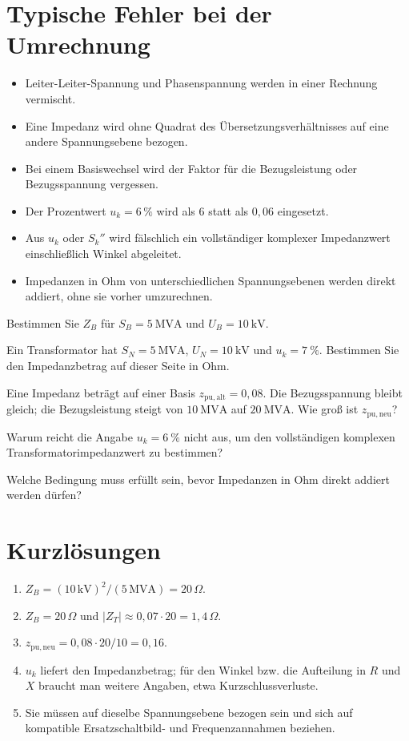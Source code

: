 \section{Typische Fehler bei der Umrechnung}
\begin{itemize}
 \item Leiter-Leiter-Spannung und Phasenspannung werden in einer Rechnung
       vermischt.
 \item Eine Impedanz wird ohne Quadrat des Übersetzungsverhältnisses auf eine
       andere Spannungsebene bezogen.
 \item Bei einem Basiswechsel wird der Faktor für die Bezugsleistung oder
       Bezugsspannung vergessen.
 \item Der Prozentwert $u_k=6\,\%$ wird als $6$ statt als $0{,}06$ eingesetzt.
 \item Aus $u_k$ oder $S_k''$ wird fälschlich ein vollständiger komplexer
       Impedanzwert einschließlich Winkel abgeleitet.
 \item Impedanzen in Ohm von unterschiedlichen Spannungsebenen werden direkt
       addiert, ohne sie vorher umzurechnen.
\end{itemize}

\begin{aufgaben}
 \item Bestimmen Sie $Z_B$ für $S_B=\SI{5}{\mega\volt\ampere}$ und
       $U_B=\SI{10}{\kilo\volt}$.
 \item Ein Transformator hat $S_N=\SI{5}{\mega\volt\ampere}$,
       $U_N=\SI{10}{\kilo\volt}$ und $u_k=\SI{7}{\percent}$. Bestimmen Sie
       den Impedanzbetrag auf dieser Seite in Ohm.
 \item Eine Impedanz beträgt auf einer Basis $z_{\mathrm{pu,alt}}=0{,}08$.
       Die Bezugsspannung bleibt gleich; die Bezugsleistung steigt von
       $\SI{10}{\mega\volt\ampere}$ auf $\SI{20}{\mega\volt\ampere}$.
       Wie groß ist $z_{\mathrm{pu,neu}}$?
 \item Warum reicht die Angabe $u_k=\SI{6}{\percent}$ nicht aus, um den
       vollständigen komplexen Transformatorimpedanzwert zu bestimmen?
 \item Welche Bedingung muss erfüllt sein, bevor Impedanzen in Ohm direkt
       addiert werden dürfen?
\end{aufgaben}

\section*{Kurzlösungen}
\begin{enumerate}[label=\arabic*.]
 \item $Z_B=(10\,\mathrm{kV})^2/(5\,\mathrm{MVA})=20\,\Omega$.
 \item $Z_B=20\,\Omega$ und $|Z_T|\approx0{,}07\cdot20=1{,}4\,\Omega$.
 \item $z_{\mathrm{pu,neu}}=0{,}08\cdot20/10=0{,}16$.
 \item $u_k$ liefert den Impedanzbetrag; für den Winkel bzw. die Aufteilung in
       $R$ und $X$ braucht man weitere Angaben, etwa Kurzschlussverluste.
 \item Sie müssen auf dieselbe Spannungsebene bezogen sein und sich auf
       kompatible Ersatzschaltbild- und Frequenzannahmen beziehen.
\end{enumerate}
